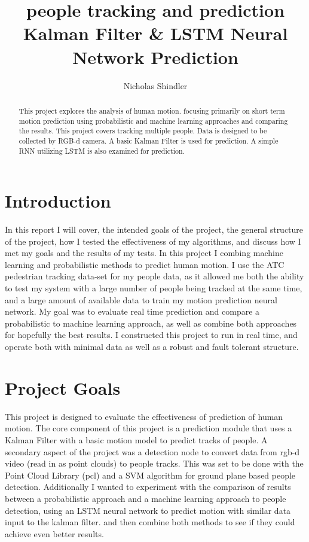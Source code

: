 \documentclass[10pt,a4paper]{article}
\author{Nicholas Shindler}
\title{people tracking and prediction \\ \large Kalman Filter \& LSTM Neural Network Prediction}
\begin{document}
\maketitle

\bigskip 

\tableofcontents

\vspace*{\fill}
\begin{abstract}
This project explores the analysis of human motion. focusing primarily on short term motion prediction using probabilistic and machine learning approaches and comparing the results. This project covers tracking multiple people. Data is designed to be collected by RGB-d camera. A basic Kalman Filter is used for prediction. A simple RNN utilizing LSTM is also examined for prediction.
\end{abstract}
\vspace*{\fill}


\section{Introduction}
In this report I will cover, the intended goals of the project, the general structure of the project, how I tested the effectiveness of my algorithms, and discuss how I met my goals and the results of my tests. In this project I combing machine learning and probabilistic methods to predict human motion. I use the ATC pedestrian tracking data-set for my people data, as it allowed me both the ability to test my system with a large number of people being tracked at the same time, and a large amount of available data to train my motion prediction neural network. My goal was to evaluate real time prediction and compare a probabilistic to machine learning approach, as well as combine both approaches for hopefully the best results. I constructed this project to run in real time, and operate both with minimal data as well as a robust and fault tolerant structure.

\section{Project Goals}
This project is designed to evaluate the effectiveness of prediction of human motion. The core component of this project is a prediction module that uses a Kalman Filter with a basic motion model to predict tracks of people. A secondary aspect of the project was a detection node to convert data from rgb-d video (read in as point clouds) to people tracks. This was set to be done with the Point Cloud Library (pcl) and a SVM algorithm for ground plane based people detection. Additionally I wanted to experiment with the comparison of results between a probabilistic approach and a machine learning approach to people detection, using an LSTM neural network to predict motion with similar data input to the kalman filter. and then combine both methods to see if they could achieve even better results.
\end{document}
